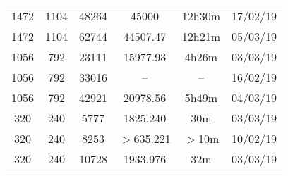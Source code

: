 \begin{center}
\begin{tabular}{ c c c | c c c }
  1472 & 1104 & 48264 & 45000 & 12h30m & 17/02/19 \\
  1472 & 1104 & 62744 & 44507.47 & 12h21m & 05/03/19 \\
  1056 & 792 & 23111 & 15977.93 & 4h26m & 03/03/19 \\
  1056 & 792 & 33016 & -- & -- & 16/02/19 \\ %
  1056 & 792 & 42921 & 20978.56 & 5h49m & 04/03/19 \\
  320 & 240 & 5777 & 1825.240 & 30m & 03/03/19 \\
  320 & 240 & 8253 & $>$635.221 & $>$10m & 10/02/19 \\
  320 & 240 & 10728 & 1933.976 & 32m & 03/03/19 \\
  \end{tabular}
  \end{center}

\newpage
